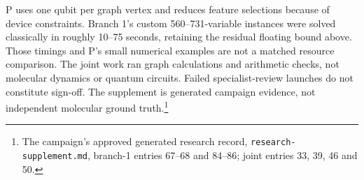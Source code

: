 \documentclass{article}
\newcommand{\rr}[1]{\footnote{The campaign's approved generated research record, \texttt{research-supplement.md}, #1.}}
\begin{document}
P uses one qubit per graph vertex and reduces feature selections because of device constraints.\cite{P} Branch 1's custom 560--731-variable instances were solved classically in roughly 10--75 seconds, retaining the residual floating bound above. Those timings and P's small numerical examples are not a matched resource comparison. The joint work ran graph calculations and arithmetic checks, not molecular dynamics or quantum circuits. Failed specialist-review launches do not constitute sign-off. The supplement is generated campaign evidence, not independent molecular ground truth.\rr{branch-1 entries 67--68 and 84--86; joint entries 33, 39, 46 and 50}



\end{document}
